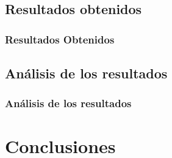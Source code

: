 \documentclass{beamer}
\begin{document}
\subsection{Resultados obtenidos}

\begin{frame}
  
  \frametitle{Resultados Obtenidos}
  
  
  

\end{frame}

\subsection{Análisis de los resultados}

\begin{frame}

  \frametitle{Análisis de los resultados}
  
  
  

\end{frame}

\section{Conclusiones}
\end{document}
